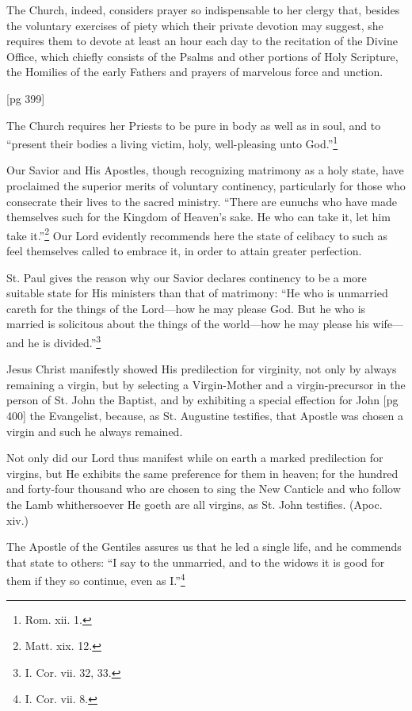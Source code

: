 The Church, indeed, considers prayer so indispensable
to her clergy that, besides the voluntary
exercises of piety which their private devotion
may suggest, she requires them to devote at least
an hour each day to the recitation of the Divine
Office, which chiefly consists of the Psalms and other
portions of Holy Scripture, the Homilies of the early
Fathers and prayers of marvelous force and unction.

[pg 399]


The Church requires her Priests to be pure in
body as well as in soul, and to “present their
bodies a living victim, holy, well-pleasing
unto God.”\footnote{Rom. xii. 1.}

Our Savior and His Apostles, though recognizing
matrimony as a holy state, have proclaimed the
superior merits of voluntary continency, particularly
for those who consecrate their lives to
the sacred ministry. “There are eunuchs who
have made themselves such for the Kingdom of
Heaven's sake. He who can take it, let him take
it.”\footnote{Matt. xix. 12.} Our Lord evidently recommends here the
state of celibacy to such as feel themselves called
to embrace it, in order to attain greater perfection.

St. Paul gives the reason why our Savior declares
continency to be a more suitable state for
His ministers than that of matrimony: “He who
is unmarried careth for the things of the Lord—how
he may please God. But he who is married
is solicitous about the things of the world—how
he may please his wife—and he is divided.”\footnote{I.
Cor. vii. 32, 33.}

Jesus Christ manifestly showed His predilection
for virginity, not only by always remaining a virgin,
but by selecting a Virgin-Mother and a virgin-precursor
in the person of St. John the Baptist,
and by exhibiting a special effection for John
[pg 400]
the Evangelist, because, as St. Augustine testifies,
that Apostle was chosen a virgin and such he always
remained.

Not only did our Lord thus manifest while on
earth a marked predilection for virgins, but He
exhibits the same preference for them in heaven;
for the hundred and forty-four thousand who are
chosen to sing the New Canticle and who follow
the Lamb whithersoever He goeth are all virgins,
as St. John testifies. (Apoc. xiv.)

The Apostle of the Gentiles assures us that he
led a single life, and he commends that state to
others: “I say to the unmarried, and to the
widows it is good for them if they so continue, even
as I.”\footnote{I. Cor. vii. 8.}

